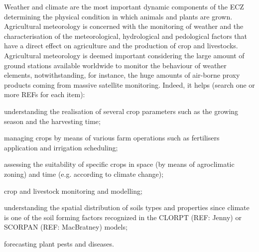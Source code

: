 \documentclass[authoryear,preprint,review,12pt]{elsarticle}
\begin{document}

Weather and climate are the most important dynamic components of the ECZ determining the physical condition in which animals and plants are grown.
Agricultural meteorology is concerned with the monitoring of weather and the characterisation of the meteorological, hydrological and pedological factors that have a direct effect on agriculture and the production of crop and livestocks.
Agricultural meteorology is deemed important considering the large amount of ground stations available worldwide to monitor the behaviour of weather elements, notwithstanding, for instance, the huge amounts of air-borne proxy products coming from massive satellite monitoring.
Indeed, it helps (search one or more REFs for each item): 
    \begin{enumerate*}
        \item understanding the realisation of several crop parameters such as the growing season and the harvesting time;
        \item managing crops by means of various farm operations such as fertilisers application and irrigation scheduling;
        \item assessing the suitability of specific crops in space (by means of agroclimatic zoning) and time (e.g. according to climate change);
        \item crop and livestock monitoring and modelling;
        \item understanding the spatial distribution of soils types and properties since climate is one of the soil forming factors recognized in the CLORPT (REF: Jenny) or SCORPAN (REF: MacBratney) models;
        \item forecasting plant pests and diseases.
    \end{enumerate*}
\end{document}
